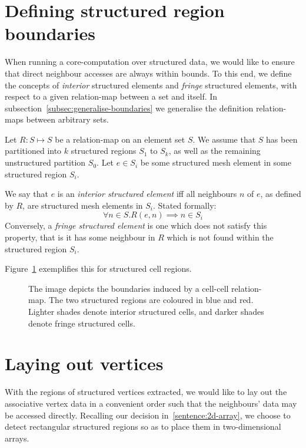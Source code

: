 \label{chap:recharting-maps}


\section{Defining structured region boundaries}
When running a core-computation over structured data, we would like to ensure that direct neighbour accesses are always within bounds. To this end, we define the concepts of \emph{interior} structured elements and \emph{fringe} structured elements, with respect to a given relation-map between a set and itself. In subsection~\ref{subsec:generalise-boundaries} we generalise the definition relation-maps between arbitrary sets.

Let $R: S \mapsto S$ be a relation-map on an element set $S$. We assume that $S$ has been partitioned into $k$ structured regions $S_1$ to $S_k$, as well as the remaining unstructured partition $S_0$.
Let $e \in S_i$ be some structured mesh element in some structured region $S_i$.

We say that $e$ is an \emph{interior structured element} iff all neighbours $n$ of $e$, as defined by $R$, are structured mesh elements in $S_i$. Stated formally:
$$\forall n \in S. R(e,n) \implies n \in S_i$$
Conversely, a \emph{fringe structured element} is one which does not satisfy this property, that is it has some neighbour in $R$ which is not found within the structured region $S_i$.

Figure~\ref{fig:fringe-cells} exemplifies this for structured cell regions.

\begin{figure}

\caption{The image depicts the boundaries induced by a cell-cell relation-map. The two structured regions are coloured in blue and red. Lighter shades denote interior structured cells, and darker shades denote fringe structured cells.}
\label{fig:fringe-cells}
\end{figure}


\section{Laying out vertices}
\label{subsec:vertex-associative-data}
With the regions of structured vertices extracted, we would like to lay out the associative vertex data in a convenient order such that the neighbours' data may be accessed directly. Recalling our decision in~\ref{sentence:2d-array}, we choose to detect rectangular structured regions so as to place them in two-dimensional arrays.

